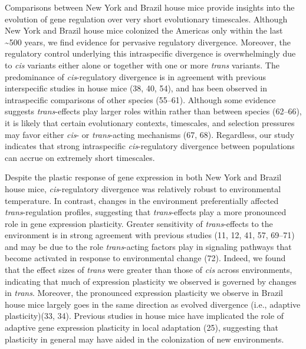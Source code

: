 \documentclass[9pt,twocolumn,twoside,lineno]{pnas-new}
\begin{document}
Comparisons between New York and Brazil house mice provide insights into
the evolution of gene regulation over very short evolutionary
timescales. Although New York and Brazil house mice colonized the
Americas only within the last \textasciitilde500 years, we find evidence
for pervasive regulatory divergence. Moreover, the regulatory control
underlying this intraspecific divergence is overwhelmingly due to
\emph{cis} variants either alone or together with one or more
\emph{trans} variants. The predominance of \emph{cis}-regulatory
divergence is in agreement with previous interspecific studies in house
mice (38, 40, 54), and has been observed in intraspecific comparisons of
other species (55--61). Although some evidence suggests
\emph{trans}-effects play larger roles within rather than between
species (62--66), it is likely that certain evolutionary contexts,
timescales, and selection pressures may favor either \emph{cis}- or
\emph{trans}-acting mechanisms (67, 68). Regardless, our study indicates
that strong intraspecific \emph{cis}-regulatory divergence between
populations can accrue on extremely short timescales.

Despite the plastic response of gene expression in both New York and
Brazil house mice, \emph{cis}-regulatory divergence was relatively
robust to environmental temperature. In contrast, changes in the
environment preferentially affected \emph{trans}-regulation profiles,
suggesting that \emph{trans}-effects play a more pronounced role in gene
expression plasticity. Greater sensitivity of \emph{trans}-effects to
the environment is in strong agreement with previous studies (11, 12,
41, 57, 69--71) and may be due to the role \emph{trans}-acting factors
play in signaling pathways that become activated in response to
environmental change (72). Indeed, we found that the effect sizes of
\emph{trans} were greater than those of \emph{cis} across environments,
indicating that much of expression plasticity we observed is governed by
changes in \emph{trans}. Moreover, the pronounced expression plasticity
we observe in Brazil house mice largely goes in the same direction as
evolved divergence (i.e., adaptive plasticity)(33, 34). Previous studies
in house mice have implicated the role of adaptive gene expression
plasticity in local adaptation (25), suggesting that plasticity in
general may have aided in the colonization of new environments.
\end{document}
